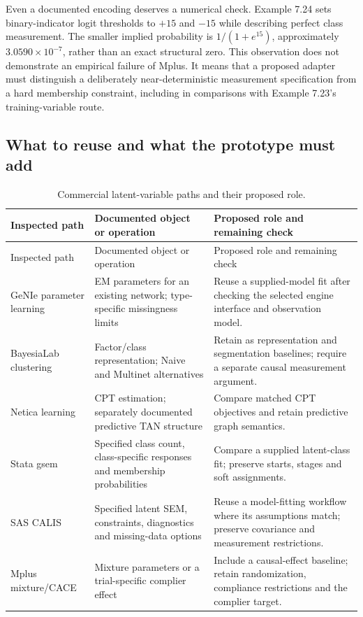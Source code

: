 Even a documented encoding deserves a numerical check. Example 7.24 sets
binary-indicator logit thresholds to \(+15\) and \(-15\) while
describing perfect class measurement. The smaller implied probability is
\(1/(1+e^{15})\), approximately \(3.0590\times10^{-7}\), rather than an
exact structural zero. This observation does not demonstrate an
empirical failure of Mplus. It means that a proposed adapter must
distinguish a deliberately near-deterministic measurement specification
from a hard membership constraint, including in comparisons with Example
7.23's training-variable route. \citep[pp.205--207]{exec13_latent_mplus,
exec13_latent_examples}

\hypertarget{what-to-reuse-and-what-the-prototype-must-add}{%
\subsection{What to reuse and what the prototype must
add}\label{what-to-reuse-and-what-the-prototype-must-add}}

\begin{longtable}{@{}P{.22\linewidth}P{.35\linewidth}P{.35\linewidth}@{}}
\caption{Commercial latent-variable paths and their proposed role.}
\label{exec13:latent-commercial-table}\\
\toprule
Inspected path & Documented object or operation & Proposed role and remaining check \\
\midrule
\endfirsthead
\toprule
Inspected path & Documented object or operation & Proposed role and remaining check \\
\midrule
\endhead
GeNIe parameter learning & EM parameters for an existing network; type-specific missingness limits & Reuse a supplied-model fit after checking the selected engine interface and observation model. \\
BayesiaLab clustering & Factor/class representation; Naive and Multinet alternatives & Retain as representation and segmentation baselines; require a separate causal measurement argument. \\
Netica learning & CPT estimation; separately documented predictive TAN structure & Compare matched CPT objectives and retain predictive graph semantics. \\
Stata gsem & Specified class count, class-specific responses and membership probabilities & Compare a supplied latent-class fit; preserve starts, stages and soft assignments. \\
SAS CALIS & Specified latent SEM, constraints, diagnostics and missing-data options & Reuse a model-fitting workflow where its assumptions match; preserve covariance and measurement restrictions. \\
Mplus mixture/CACE & Mixture parameters or a trial-specific complier effect & Include a causal-effect baseline; retain randomization, compliance restrictions and the complier target. \\
\bottomrule
\end{longtable}

